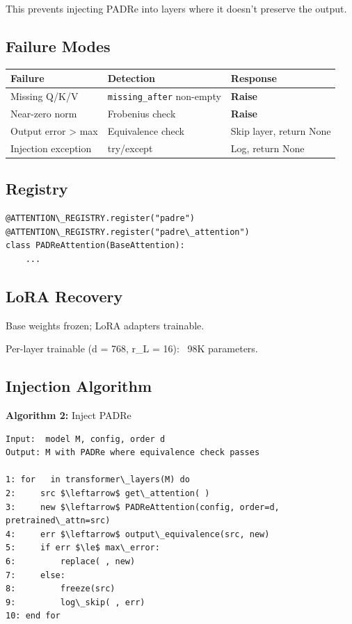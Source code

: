 This prevents injecting PADRe into layers where it doesn't preserve the 
output.

\subsection{Failure Modes}

\begin{table}[H]
\centering
\small
\begin{tabular}{lll}
\toprule
\textbf{Failure} & \textbf{Detection} & \textbf{Response} \\
\midrule
Missing Q/K/V & \texttt{missing\_after} non-empty & \textbf{Raise} \\
Near-zero norm & Frobenius check & \textbf{Raise} \\
Output error \textgreater{} max & Equivalence check & Skip layer, return None \\
Injection exception & try/except & Log, return None \\
\bottomrule
\end{tabular}
\end{table}

\subsection{Registry}

\begin{lstlisting}
@ATTENTION\_REGISTRY.register("padre")
@ATTENTION\_REGISTRY.register("padre\_attention")
class PADReAttention(BaseAttention):
    ...
\end{lstlisting}

\subsection{LoRA Recovery}

Base weights frozen; LoRA adapters trainable.

Per-layer trainable (d = 768, r\_L = 16): ~98K parameters.

\subsection{Injection Algorithm}

\textbf{Algorithm 2:} Inject PADRe
\begin{lstlisting}
Input:  model M, config, order d
Output: M with PADRe where equivalence check passes

1: for   in transformer\_layers(M) do
2:     src $\leftarrow$ get\_attention( )
3:     new $\leftarrow$ PADReAttention(config, order=d, pretrained\_attn=src)
4:     err $\leftarrow$ output\_equivalence(src, new)
5:     if err $\le$ max\_error:
6:         replace( , new)
7:     else:
8:         freeze(src)
9:         log\_skip( , err)
10: end for
\end{lstlisting}

